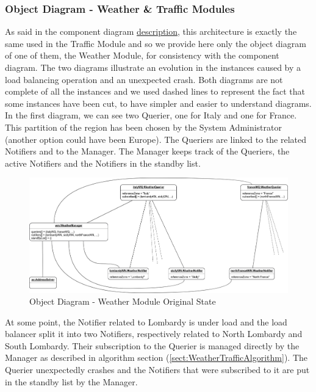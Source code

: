 	\subsubsection{Object Diagram - Weather \& Traffic Modules}
		As said in the component diagram \hyperref[sect:WeatherTrafficModules]{description}, this architecture is exactly the same used in the Traffic Module and so we provide here only the object diagram of one of them, the Weather Module, for consistency with the component diagram.\newline
		The two diagrams illustrate an evolution in the instances caused by a load balancing operation and an unexpected crash. Both diagrams are not complete of all the instances and we used dashed lines to represent the fact that some instances have been cut, to have simpler and easier to understand diagrams.\newline
		In the first diagram, we can see two Querier, one for Italy and one for France. This partition of the region has been chosen by the System Administrator (another option could have been Europe). The Queriers are linked to the related Notifiers and to the Manager. The Manager keeps track of the Queriers, the active Notifiers and the Notifiers in the standby list.
		\begin{figure}[H]
			\centerline{\includegraphics[width=0.9\paperwidth]{Images/OD_WeatherModule_Before}}
			\caption{Object Diagram - Weather Module Original State}
		\end{figure}
		\noindent
		At some point, the Notifier related to Lombardy is under load and the load balancer split it into two Notifiers, respectively related to North Lombardy and South Lombardy. Their subscription to the Querier  is managed directly by the Manager as described in algorithm section (\ref{sect:WeatherTrafficAlgorithm}).\newline
		The  Querier unexpectedly crashes and the Notifiers that were subscribed to it are put in the standby list by the Manager.\newline
